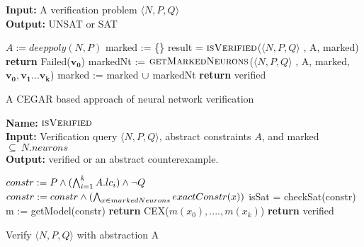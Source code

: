 








\begin{algorithm}[t]
  \textbf{Input: } A verification problem $\langle N,P,Q \rangle$ \\
  \textbf{Output: } UNSAT or SAT
  \begin{algorithmic}[1]
    \State $A := deeppoly(N,P)$
    \State marked := \{\}
      \State result = $\textsc{isVerified}$($\langle N,P,Q \rangle$ , A, marked)
          \State \textbf{return} Failed($\boldsymbol{v_0}$)
        \Else
        \State markedNt := $\textsc{getMarkedNeurons}$($\langle N,P,Q \rangle$ , A, marked, $\boldsymbol{v_0}, \boldsymbol{v_1} ... \boldsymbol{v_k}$)
          \State marked := marked ${\cup}$ markedNt
        \EndIf
      \Else
        \State \textbf{return} verified
      \EndIf
    \EndWhile
  \end{algorithmic}
  \caption{A CEGAR based approach of neural network verification}
  \label{algo:main}
\end{algorithm}

\begin{algorithm}[t]
  \textbf{Name: } $\textsc{isVerified}$ \\
  \textbf{Input: } Verification query $\langle N,P,Q \rangle$, abstract constraints $A$, and marked $\subseteq ~ N.neurons$ \\
  \textbf{Output: } verified or an abstract counterexample. 
  \begin{algorithmic}[1]
    \State $constr := P \land (\bigwedge_{i=1}^k A.lc_i)\land \neg Q$
    \State $constr := constr \land (\bigwedge_{x \in markedNeurons} exactConstr(x))$ 
    \State isSat = checkSat(constr)
      \State m := getModel(constr)
      \State \textbf{return} CEX($m(x_0),....,m(x_k)$)
    \Else
      \State \textbf{return} verified
    \EndIf
  \end{algorithmic}
  \caption{Verify $\langle N,P,Q \rangle$ with abstraction A}
  \label{algo:verif1}
\end{algorithm}

